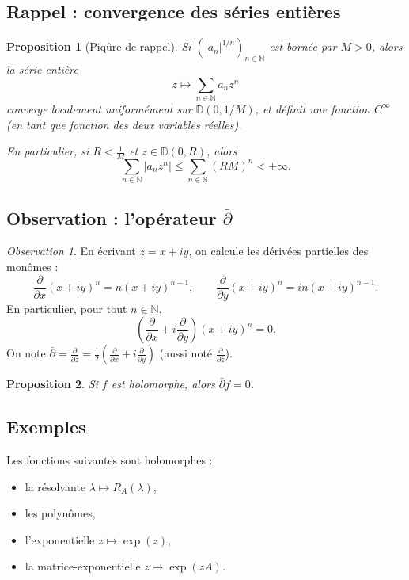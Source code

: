 \documentclass[12pt,a4paper]{article}
\theoremstyle{definition}
\theoremstyle{plain}
\newtheorem{proposition}{Proposition}[section]
\theoremstyle{remark}
\newtheorem{observation}{Observation}[section]
\newcommand{\NN}{\mathbb{N}}
\newcommand{\DD}{\mathbb{D}}
\newcommand{\dbar}{\bar{\partial}}
\begin{document}
\subsection{Rappel : convergence des séries entières}

\begin{proposition}[Piqûre de rappel]
Si $(|a_n|^{1/n})_{n\in\NN}$ est bornée par $M > 0$, alors la série entière
\[
  z \mapsto \sum_{n \in \NN} a_n z^n
\]
converge localement uniformément sur $\DD(0, 1/M)$, et définit une fonction
$C^\infty$ (en tant que fonction des deux variables réelles).

En particulier, si $R < \frac{1}{M}$ et $z \in \DD(0,R)$, alors
\[
  \sum_{n \in \NN} |a_n z^n| \leq \sum_{n \in \NN} (RM)^n < +\infty.
\]
\end{proposition}

\subsection{Observation : l'opérateur \texorpdfstring{$\dbar$}{d-bar}}

\begin{observation}
En écrivant $z = x + iy$, on calcule les dérivées partielles des monômes :
\[
  \frac{\partial}{\partial x}(x+iy)^n = n(x+iy)^{n-1},
  \qquad
  \frac{\partial}{\partial y}(x+iy)^n = in(x+iy)^{n-1}.
\]
En particulier, pour tout $n \in \NN$,
\[
  \left(\frac{\partial}{\partial x} + i\frac{\partial}{\partial y}\right)(x+iy)^n = 0.
\]
On note $\dbar = \frac{\partial}{\partial \bar{z}} = \frac{1}{2}\!\left(\frac{\partial}{\partial x} + i\frac{\partial}{\partial y}\right)$
(aussi noté $\frac{\partial}{\partial \bar{z}}$).
\end{observation}

\begin{proposition}
\label{prop:dbar}
Si $f$ est holomorphe, alors $\dbar f = 0$.
\end{proposition}

\subsection{Exemples}

Les fonctions suivantes sont holomorphes :
\begin{itemize}[leftmargin=2em]
  \item la résolvante $\lambda \mapsto R_A(\lambda)$,
  \item les polynômes,
  \item l'exponentielle $z \mapsto \exp(z)$,
  \item la matrice-exponentielle $z \mapsto \exp(zA)$.
\end{itemize}
\end{document}
